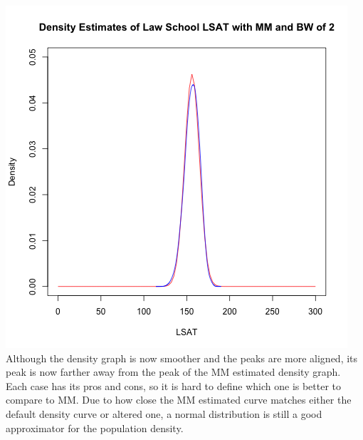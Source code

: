 \documentclass[12pt, letterpaper]{article}
\begin{document}
\includegraphics[scale=0.85]{Lawschool_LSAT_Density_mmbw} \\
Although the density graph is now smoother and the peaks are more aligned, its peak is now farther away from the peak of the MM estimated density graph. Each case has its pros and cons, so it is hard to define which one is better to compare to MM. Due to how close the MM estimated curve matches either the default density curve or altered one, a normal distribution is still a good approximator for the population density. 
\end{document}
